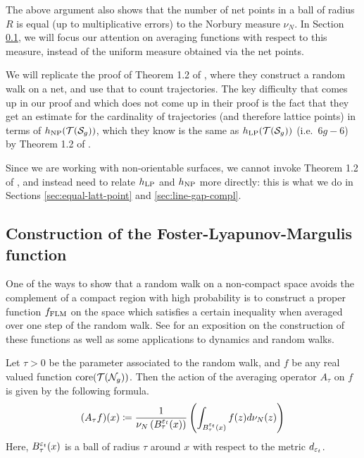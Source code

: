 The above argument also shows that the number of net points in a ball of radius $R$ is equal (up to multiplicative errors) to the Norbury measure $\nu_N$.
In Section \ref{sec:constr-marg-funct}, we will focus our attention on averaging functions with respect to this measure, instead of the uniform measure obtained via the net points.

We will replicate the proof of Theorem 1.2 of \textcite{eskinmirzakhani}, where they construct a random walk on a net, and use that to count \concave trajectories.
The key difficulty that comes up in our proof and which does not come up in their proof is the fact that they get an estimate for the cardinality of \concave trajectories (and therefore \concave lattice points) in terms of $h_{\mathrm{NP}}(\mathcal{T}(\mathcal{S}_g))$, which they know is the same as $h_{\mathrm{LP}}(\mathcal{T}(\mathcal{S}_g))$ (i.e.\ $6g-6$) by Theorem 1.2 of \textcite{10.1215/00127094-1548443}.

Since we are working with non-orientable surfaces, we cannot invoke Theorem 1.2 of \textcite{10.1215/00127094-1548443}, and instead need to relate $h_{\mathrm{LP}}$ and $h_{\mathrm{NP}}$ more directly: this is what we do in Sections \ref{sec:equal-latt-point} and \ref{sec:line-gap-compl}.

\subsection{Construction of the Foster-Lyapunov-Margulis function}
\label{sec:constr-marg-funct}

One of the ways to show that a random walk on a non-compact space avoids the complement of a compact region with high probability is to construct a proper function $f_{\mathrm{FLM}}$ on the space which satisfies a certain inequality when averaged over one step of the random walk.
See \textcite{EskinMozes+2022+342+361} for an exposition on the construction of these functions as well as some applications to dynamics and random walks.

\begin{definition}
  Let $\tau > 0$ be the parameter associated to the random walk, and $f$ be any real valued function $\mathrm{core}(\mathcal{T}(\mathcal{N}_g))$.
  Then the action of the averaging operator $A_{\tau}$ on $f$ is given by the following formula.
  \begin{align*}
    (A_{\tau}f)(x) \coloneqq \frac{1}{\nu_N\left( B_{\tau}^{\varepsilon_t}(x) \right)} \left( \int_{B_{\tau}^{\varepsilon_t}(x)} f(z) d\nu_N(z) \right)
  \end{align*}
  Here, $B_{\tau}^{\varepsilon_t}(x)$ is a ball of radius $\tau$ around $x$ with respect to the metric $d_{\varepsilon_t}$.
\end{definition}

